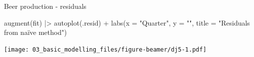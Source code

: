 \documentclass[
  14pt,
  ignorenonframetext,
  aspectratio=169,
]{beamer}
\newenvironment{Shaded}{\begin{snugshade}}{\end{snugshade}}
\newcommand{\AttributeTok}[1]{\textcolor[rgb]{0.77,0.63,0.00}{#1}}
\newcommand{\FunctionTok}[1]{\textcolor[rgb]{0.00,0.00,0.00}{#1}}
\newcommand{\NormalTok}[1]{\textcolor[rgb]{0.00,0.00,0.00}{#1}}
\newcommand{\SpecialCharTok}[1]{\textcolor[rgb]{0.00,0.00,0.00}{#1}}
\newcommand{\StringTok}[1]{\textcolor[rgb]{0.31,0.60,0.02}{#1}}
\renewenvironment{Shaded}{\vspace*{0.15cm}\color{black}\fontsize{10}{10}\sf\begin{snugshade}\color{black}}{\end{snugshade}}
\begin{document}
\begin{frame}[fragile]{Beer production - residuals}
\protect\hypertarget{beer-production---residuals}{}
\fontsize{10}{10}\sf

\begin{Shaded}
\begin{Highlighting}[]
\FunctionTok{augment}\NormalTok{(fit) }\SpecialCharTok{|\textgreater{}}
  \FunctionTok{autoplot}\NormalTok{(.resid) }\SpecialCharTok{+}
  \FunctionTok{labs}\NormalTok{(}\AttributeTok{x =} \StringTok{"Quarter"}\NormalTok{, }\AttributeTok{y =} \StringTok{""}\NormalTok{, }\AttributeTok{title =} \StringTok{"Residuals from naïve method"}\NormalTok{)}
\end{Highlighting}
\end{Shaded}

\texttt{[image: 03\_basic\_modelling\_files/figure-beamer/dj5-1.pdf]}
\end{frame}
\end{document}
